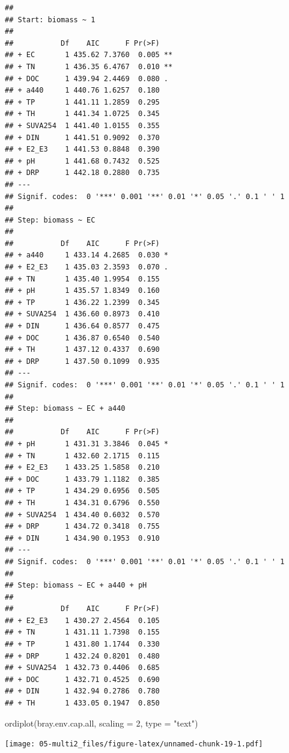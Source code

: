 \documentclass[
]{book}
\newenvironment{Shaded}{\begin{snugshade}}{\end{snugshade}}
\newcommand{\AttributeTok}[1]{\textcolor[rgb]{0.77,0.63,0.00}{#1}}
\newcommand{\DecValTok}[1]{\textcolor[rgb]{0.00,0.00,0.81}{#1}}
\newcommand{\FunctionTok}[1]{\textcolor[rgb]{0.00,0.00,0.00}{#1}}
\newcommand{\NormalTok}[1]{#1}
\newcommand{\StringTok}[1]{\textcolor[rgb]{0.31,0.60,0.02}{#1}}
\begin{document}
\begin{verbatim}
## 
## Start: biomass ~ 1 
## 
##           Df    AIC      F Pr(>F)   
## + EC       1 435.62 7.3760  0.005 **
## + TN       1 436.35 6.4767  0.010 **
## + DOC      1 439.94 2.4469  0.080 . 
## + a440     1 440.76 1.6257  0.180   
## + TP       1 441.11 1.2859  0.295   
## + TH       1 441.34 1.0725  0.345   
## + SUVA254  1 441.40 1.0155  0.355   
## + DIN      1 441.51 0.9092  0.370   
## + E2_E3    1 441.53 0.8848  0.390   
## + pH       1 441.68 0.7432  0.525   
## + DRP      1 442.18 0.2880  0.735   
## ---
## Signif. codes:  0 '***' 0.001 '**' 0.01 '*' 0.05 '.' 0.1 ' ' 1
## 
## Step: biomass ~ EC 
## 
##           Df    AIC      F Pr(>F)  
## + a440     1 433.14 4.2685  0.030 *
## + E2_E3    1 435.03 2.3593  0.070 .
## + TN       1 435.40 1.9954  0.155  
## + pH       1 435.57 1.8349  0.160  
## + TP       1 436.22 1.2399  0.345  
## + SUVA254  1 436.60 0.8973  0.410  
## + DIN      1 436.64 0.8577  0.475  
## + DOC      1 436.87 0.6540  0.540  
## + TH       1 437.12 0.4337  0.690  
## + DRP      1 437.50 0.1099  0.935  
## ---
## Signif. codes:  0 '***' 0.001 '**' 0.01 '*' 0.05 '.' 0.1 ' ' 1
## 
## Step: biomass ~ EC + a440 
## 
##           Df    AIC      F Pr(>F)  
## + pH       1 431.31 3.3846  0.045 *
## + TN       1 432.60 2.1715  0.115  
## + E2_E3    1 433.25 1.5858  0.210  
## + DOC      1 433.79 1.1182  0.385  
## + TP       1 434.29 0.6956  0.505  
## + TH       1 434.31 0.6796  0.550  
## + SUVA254  1 434.40 0.6032  0.570  
## + DRP      1 434.72 0.3418  0.755  
## + DIN      1 434.90 0.1953  0.910  
## ---
## Signif. codes:  0 '***' 0.001 '**' 0.01 '*' 0.05 '.' 0.1 ' ' 1
## 
## Step: biomass ~ EC + a440 + pH 
## 
##           Df    AIC      F Pr(>F)
## + E2_E3    1 430.27 2.4564  0.105
## + TN       1 431.11 1.7398  0.155
## + TP       1 431.80 1.1744  0.330
## + DRP      1 432.24 0.8201  0.480
## + SUVA254  1 432.73 0.4406  0.685
## + DOC      1 432.71 0.4525  0.690
## + DIN      1 432.94 0.2786  0.780
## + TH       1 433.05 0.1947  0.850
\end{verbatim}

\begin{Shaded}
\begin{Highlighting}[]
\FunctionTok{ordiplot}\NormalTok{(bray.env.cap.all, }\AttributeTok{scaling =} \DecValTok{2}\NormalTok{, }\AttributeTok{type =} \StringTok{"text"}\NormalTok{)}
\end{Highlighting}
\end{Shaded}

\texttt{[image: 05-multi2\_files/figure-latex/unnamed-chunk-19-1.pdf]}
\end{document}
